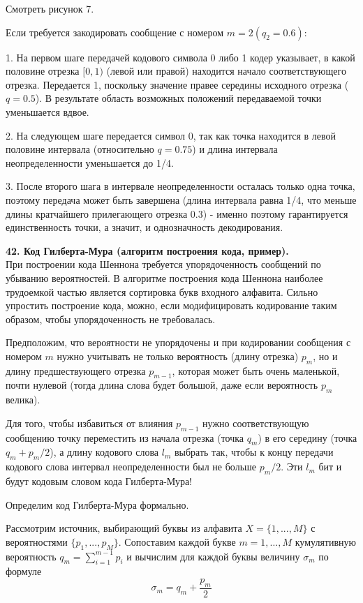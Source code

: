 \documentclass[14pt]{article}
\begin{document}
Смотреть рисунок 7.

Если требуется закодировать сообщение с номером \(m = 2 (q_2 = 0.6)\):

1. На первом шаге передачей кодового символа 0 либо 1 кодер указывает, в какой половине отрезка \([0,1)\) (левой или правой) находится начало соответствующего отрезка. Передается 1, поскольку значение правее середины исходного отрезка (\(q = 0.5\)). В результате область возможных положений передаваемой точки уменьшается вдвое.

2. На следующем шаге передается символ 0, так как точка находится в левой половине интервала (относительно \(q = 0.75\)) и длина интервала неопределенности уменьшается до 1/4.

3. После второго шага в интервале неопределенности осталась только одна точка, поэтому передача может быть завершена (длина интервала равна 1/4, что меньше длины кратчайшего прилегающего отрезка 0.3) - именно поэтому гарантируется единственность точки, а значит, и однозначность декодирования.


\bigskip
\textbf{42. Код Гилберта-Мура (алгоритм построения кода, пример).} \\

При построении кода Шеннона требуется упорядоченность сообщений по убыванию вероятностей. В алгоритме построения кода Шеннона наиболее трудоемкой частью является сортировка букв входного алфавита. Сильно упростить построение кода, можно, если модифицировать кодирование таким образом, чтобы упорядоченность не требовалась.

Предположим, что вероятности не упорядочены и при кодировании сообщения с номером \(m\) нужно учитывать не только вероятность (длину отрезка) \(p_m\), но и длину предшествующего отрезка \(p_{m-1}\), которая может быть очень маленькой, почти нулевой (тогда длина слова будет большой, даже если вероятность \(p_m\)велика).

Для того, чтобы избавиться от влияния \(p_{m-1}\) нужно соответствующую сообщению точку переместить из начала отрезка (точка \(q_m\)) в его середину (точка \(q_m + p_m / 2\)), а длину кодового слова \(l_m\) выбрать так, чтобы к концу передачи кодового слова интервал неопределенности был не больше \(p_m / 2\). Эти \(l_m\) бит и будут кодовым словом кода Гилберта-Мура!

Определим код Гилберта-Мура формально.

Рассмотрим источник, выбирающий буквы из алфавита \(X = \{1,...,M\}\) с вероятностями \(\{p_1,...,p_M\}\). Сопоставим каждой букве \(m = 1,\ldots,M\) кумулятивную вероятность \(q_m = \sum_{i=1}^{m-1} p_i\) и вычислим для каждой буквы величину \(\sigma_m\) по формуле
\begin{displaymath}
    \sigma_m = q_m + \frac{p_m}{2}
\end{displaymath}
\end{document}
